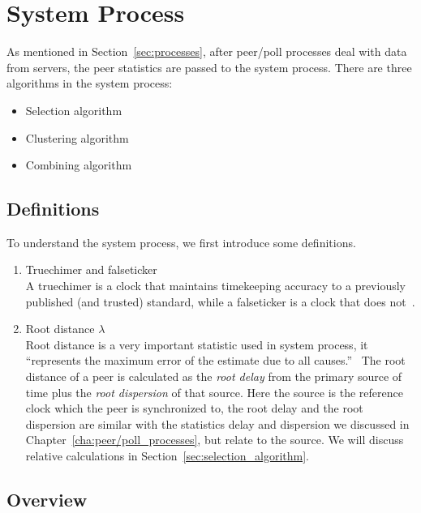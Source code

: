 

\chapter{System Process}
\label{cha:system_process}

As mentioned in Section~\ref{sec:processes}, after peer/poll processes deal
with data from servers, the peer statistics are passed to the system process.
There are three algorithms in the system process:
\begin{itemize}
    \item Selection algorithm
    \item Clustering algorithm
    \item Combining algorithm
\end{itemize}

\section{Definitions}%
\label{sec:system_concepts}
To understand the system process, we first introduce some definitions.

\begin{enumerate}
    \item Truechimer and falseticker\\
        A truechimer is a clock that maintains timekeeping accuracy to a
        previously published (and trusted) standard, while a falseticker is a
        clock that does not~\cite{redbook}.
    \item Root distance $\lambda$\\
        Root distance is a very important statistic used in system process, it
        ``represents the maximum error of the estimate due to all
        causes.''~\cite{performance_metrics} The root distance of a peer is
        calculated as the \emph{root delay} from the primary source of time
        plus the \emph{root dispersion} of that source. Here the source is the
        reference clock which the peer is synchronized to, the root delay and
        the root dispersion are similar with the statistics delay and
        dispersion we discussed in Chapter~\ref{cha:peer/poll_processes}, but
        relate to the source. We will discuss relative calculations in
        Section~\ref{sec:selection_algorithm}.
\end{enumerate}

\section{Overview}%
\label{sec:system_overview}

